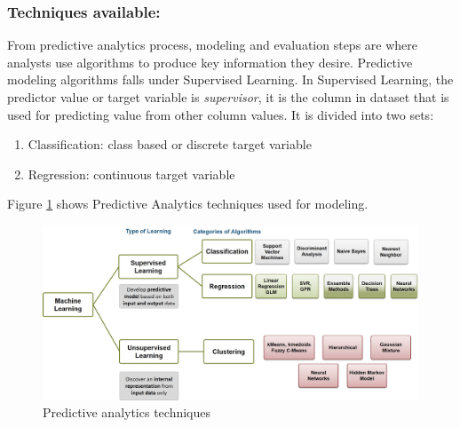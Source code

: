 \documentclass[runningheads]{llncs}
\begin{document}
\subsubsection{Techniques available:}
From predictive analytics process, modeling and evaluation steps are where analysts use algorithms to produce key information they desire. Predictive modeling algorithms \cite{7} falls under Supervised Learning. In Supervised Learning, the predictor value or target variable is \textit{supervisor}, it is the column in dataset that is used for predicting value from other column values. It is divided into two sets:
\begin{enumerate}
	\item Classification: class based or discrete target variable
	\item Regression: continuous target variable 
\end{enumerate} 
Figure \ref{fig:Figure2} shows Predictive Analytics techniques used for modeling\cite{8}.
\begin{figure}[htbp]
	\centering
	
	\includegraphics[scale=0.35]{Figure2.jpg}
	\caption{Predictive analytics techniques}
	\label{fig:Figure2}
\end{figure}

\vspace{-4mm}
\end{document}
